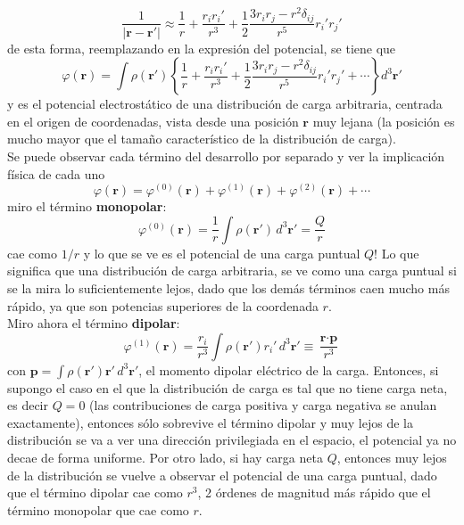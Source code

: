 \begin{equation}
    \frac{1}{|\textbf{r}-\textbf{r}'|}
    \approx 
    \frac{1}{r}
    +
    \frac{r_{i}r_{i}'}{r^{3}}
    +
    \frac{1}{2}
    \frac{3r_{i}r_{j} - r^{2}\delta_{ij}}{r^{5}}
    r_{i}'r_{j}'
        \label{ec:DesarrolloMultipolarCartesianas}
\end{equation}
de esta forma, reemplazando en la expresión del potencial, se tiene que
\begin{equation*}
    \varphi(\textbf{r}) =
    \int
    \rho(\textbf{r}')
        \left\{
            \frac{1}{r}
            +
            \frac{r_{i}r_{i}'}{r^{3}}
            +
            \frac{1}{2}
            \frac{3r_{i}r_{j} - r^{2}\delta_{ij}}{r^{5}}
            r_{i}'r_{j}'
            +
            \cdots
        \right\}
    d^{3}\textbf{r}'
\end{equation*}
y es el potencial electrostático de una distribución de carga arbitraria, centrada en el origen de coordenadas, vista desde una posición $\textbf{r}$ muy lejana (la posición es mucho mayor que el tamaño característico de la distribución de carga).\\
\indent Se puede observar cada término del desarrollo por separado y ver la implicación física de cada uno
\begin{equation*}
    \varphi(\textbf{r}) = 
    \varphi^{(0)}(\textbf{r}) + \varphi^{(1)}(\textbf{r}) + \varphi^{(2)}(\textbf{r}) + \cdots
\end{equation*}
miro el término \textbf{monopolar}:
\begin{equation*}
    \varphi^{(0)}(\textbf{r}) 
    = \frac{1}{r}\int \rho(\textbf{r}')\,d^{3}\textbf{r}'
    = \frac{Q}{r}
\end{equation*}
cae como $1/r$ y lo que se ve es el potencial de una carga puntual $Q$! Lo que significa que una distribución de carga arbitraria, se ve como una carga puntual si se la mira lo suficientemente lejos, dado que los demás términos caen mucho más rápido, ya que son potencias superiores de la coordenada $r$.\\
\indent Miro ahora el término \textbf{dipolar}:
\begin{equation*}
    \varphi^{(1)}(\textbf{r})
    = \frac{r_{i}}{r^{3}}\int \rho(\textbf{r}')r_{i}'\,d^{3}\textbf{r}'
    \equiv \frac{\textbf{r}\cdot\textbf{p}}{r^{3}}
\end{equation*}
con $\textbf{p} = \int \rho(\textbf{r}')\textbf{r}'\,d^{3}\textbf{r}'$, el momento dipolar eléctrico de la carga. Entonces, si supongo el caso en el que la distribución de carga es tal que no tiene carga neta, es decir $Q = 0$ (las contribuciones de carga positiva y carga negativa se anulan exactamente), entonces sólo sobrevive el término dipolar y muy lejos de la distribución se va a ver una dirección privilegiada en el espacio, el potencial ya no decae de forma uniforme. Por otro lado, si hay carga neta $Q$, entonces muy lejos de la distribución se vuelve a observar el potencial de una carga puntual, dado que el término dipolar cae como $r^{3}$, 2 órdenes de magnitud más rápido que el término monopolar que cae como $r$.\\
